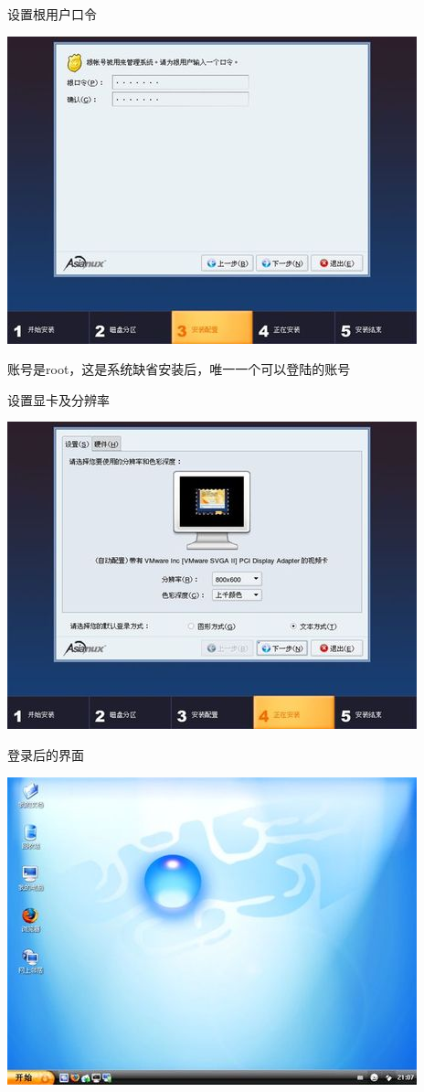\begin{frame}{设置根用户口令}

\includegraphics[width=.7\textwidth]{images/axs3-install/password}

\alert{账号是root，这是系统缺省安装后，唯一一个可以登陆的账号}

\end{frame}
\begin{frame}{设置显卡及分辨率}

\includegraphics[width=.5\textwidth]{images/axs3-install/resolution}

\end{frame}
\begin{frame}{登录后的界面}

\includegraphics[width=.5\textwidth]{images/axs3-install/desktop}
\end{frame}

